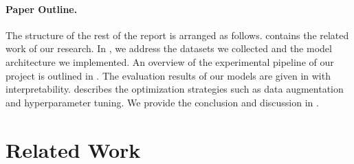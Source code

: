 \paragraph{Paper Outline.}
The structure of the rest of the report is arranged as follows. 
 contains the related work of our research. 
In , 
we address the datasets we collected and the model architecture we implemented. 
An overview of the experimental pipeline of our project is outlined in . 
The evaluation results of our models are given in  with interpretability. 
 describes the optimization strategies such as data augmentation and hyperparameter tuning. 
We provide the conclusion and discussion in . 

\section{Related Work}
\label{sec:related}


